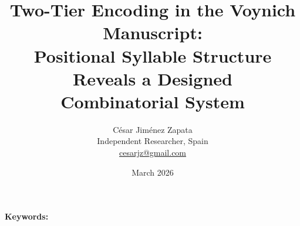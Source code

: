 \documentclass[14pt,a5paper]{extarticle}
\begin{document}
\title{Two-Tier Encoding in the Voynich Manuscript:\\
Positional Syllable Structure Reveals a Designed\\
Combinatorial System}

\author{C\'esar Jim\'enez Zapata\\
\small Independent Researcher, Spain\\
\small \href{mailto:cesarjz@gmail.com}{cesarjz@gmail.com}}

\date{March 2026}

\maketitle

\begin{abstract}

\end{abstract}

\noindent\textbf{Keywords:} 





\end{document}
